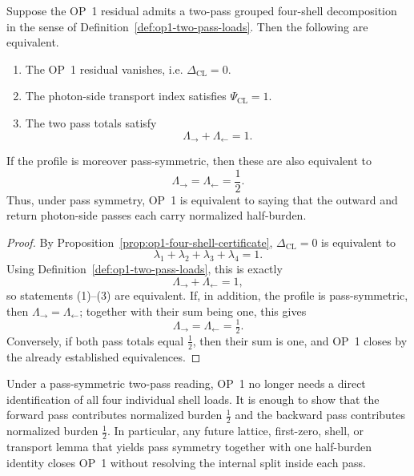\begin{proposition}
\label{prop:op1-two-pass-half-burden}
Suppose the OP~1 residual admits a two-pass grouped four-shell decomposition in the sense of Definition~\ref{def:op1-two-pass-loads}. Then the following are equivalent.
\begin{enumerate}[leftmargin=2em]
  \item The OP~1 residual vanishes, i.e. \(\Delta_{\mathrm{CL}}=0\).
  \item The photon-side transport index satisfies \(\Psi_{\mathrm{CL}}=1\).
  \item The two pass totals satisfy
  \[
    \Lambda_{\rightarrow}+\Lambda_{\leftarrow}=1.
  \]
\end{enumerate}
If the profile is moreover pass-symmetric, then these are also equivalent to
\[
  \Lambda_{\rightarrow}=\Lambda_{\leftarrow}=\frac12.
\]
Thus, under pass symmetry, OP~1 is equivalent to saying that the outward and return photon-side passes each carry normalized half-burden.
\end{proposition}

\begin{proof}
By Proposition~\ref{prop:op1-four-shell-certificate}, \(\Delta_{\mathrm{CL}}=0\) is equivalent to
\[
  \lambda_1+\lambda_2+\lambda_3+\lambda_4=1.
\]
Using Definition~\ref{def:op1-two-pass-loads}, this is exactly
\[
  \Lambda_{\rightarrow}+\Lambda_{\leftarrow}=1,
\]
so statements (1)--(3) are equivalent. If, in addition, the profile is pass-symmetric, then \(\Lambda_{\rightarrow}=\Lambda_{\leftarrow}\); together with their sum being one, this gives
\[
  \Lambda_{\rightarrow}=\Lambda_{\leftarrow}=\tfrac12.
\]
Conversely, if both pass totals equal \(\tfrac12\), then their sum is one, and OP~1 closes by the already established equivalences.
\end{proof}

\begin{corollary}
\label{cor:op1-two-pass-reduction}
Under a pass-symmetric two-pass reading, OP~1 no longer needs a direct identification of all four individual shell loads. It is enough to show that the forward pass contributes normalized burden \(\tfrac12\) and the backward pass contributes normalized burden \(\tfrac12\). In particular, any future lattice, first-zero, shell, or transport lemma that yields pass symmetry together with one half-burden identity closes OP~1 without resolving the internal split inside each pass.
\end{corollary}

